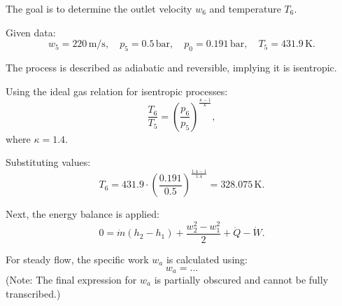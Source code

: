 The goal is to determine the outlet velocity \( w_6 \) and temperature \( T_6 \).  

Given data:  
\[
w_5 = 220 \, \text{m/s}, \quad p_5 = 0.5 \, \text{bar}, \quad p_0 = 0.191 \, \text{bar}, \quad T_5 = 431.9 \, \text{K}.
\]  

The process is described as adiabatic and reversible, implying it is isentropic.  

Using the ideal gas relation for isentropic processes:  
\[
\frac{T_6}{T_5} = \left( \frac{p_6}{p_5} \right)^{\frac{\kappa - 1}{\kappa}},
\]  
where \( \kappa = 1.4 \).  

Substituting values:  
\[
T_6 = 431.9 \cdot \left( \frac{0.191}{0.5} \right)^{\frac{1.4 - 1}{1.4}} = 328.075 \, \text{K}.
\]  

Next, the energy balance is applied:  
\[
0 = \dot{m} \left( h_2 - h_1 \right) + \frac{w_2^2 - w_1^2}{2} + \dot{Q} - \dot{W}.
\]  

For steady flow, the specific work \( w_a \) is calculated using:  
\[
w_a = \dots
\]  
(Note: The final expression for \( w_a \) is partially obscured and cannot be fully transcribed.)